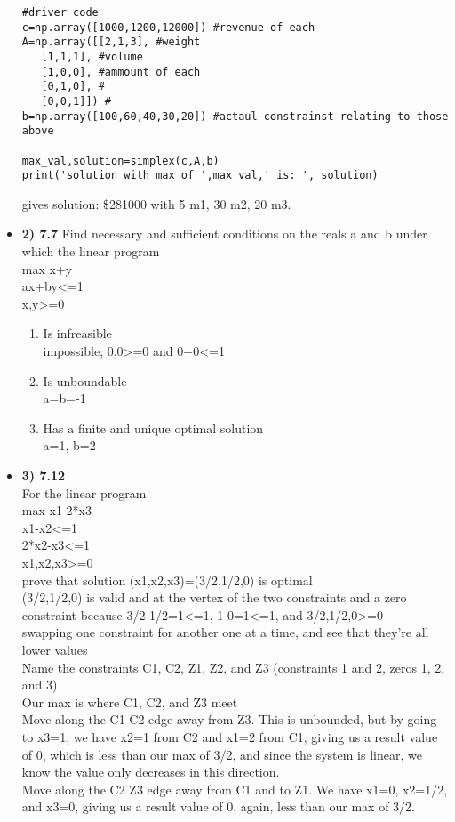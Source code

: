 \documentclass[11pt]{article}
\def\a{\alpha}
\begin{document}
\begin{itemize}
\begin{verbatim}
#driver code
c=np.array([1000,1200,12000]) #revenue of each
A=np.array([[2,1,3], #weight
   [1,1,1], #volume
   [1,0,0], #ammount of each
   [0,1,0], #
   [0,0,1]]) #
b=np.array([100,60,40,30,20]) #actaul constrainst relating to those above

max_val,solution=simplex(c,A,b)
print('solution with max of ',max_val,' is: ', solution)
\end{verbatim}
gives solution: \$281000 with 5 m1, 30 m2, 20 m3. 
\item \textbf{2) 7.7}
Find necessary and sufficient conditions on the reals a and b under which the linear program
\\max x+y
\\ax+by<=1
\\x,y>=0
\begin{enumerate}
\item Is infreasible
\\impossible, 0,0>=0 and 0+0<=1
\item Is unboundable
\\a=b=-1
\item Has a finite and unique optimal solution
\\a=1, b=2
\end{enumerate}
\item \textbf{3) 7.12}
\\For the linear program
\\max x1-2*x3
\\x1-x2<=1
\\2*x2-x3<=1
\\x1,x2,x3>=0
\\prove that solution (x1,x2,x3)=(3/2,1/2,0) is optimal
\\(3/2,1/2,0) is valid and at the vertex of the two constraints and a zero constraint because 3/2-1/2=1<=1, 1-0=1<=1, and 3/2,1/2,0>=0
\\swapping one constraint for another one at a time, and see that they're all lower values
\\Name the constraints C1, C2, Z1, Z2, and Z3 (constraints 1 and 2, zeros 1, 2, and 3)
\\Our max is where C1, C2, and Z3 meet
\\Move along the C1 C2 edge away from Z3. This is unbounded, but by going to x3=1, we have x2=1 from C2 and x1=2 from C1, giving us a result value of 0, which is less than our max of 3/2, and since the system is linear, we know the value only decreases in this direction.
\\Move along the C2 Z3 edge away from C1 and to Z1. We have x1=0, x2=1/2, and x3=0, giving us a result value of 0, again, less than our max of 3/2.

\end{itemize}
\end{document}
